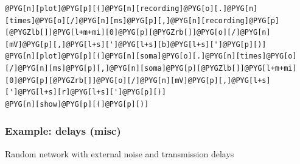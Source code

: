 \documentclass[letterpaper,10pt,english]{manual}
\begin{document}
\begin{Verbatim}[commandchars=@\[\]]
@PYG[n][plot]@PYG[p][(]@PYG[n][recording]@PYG[o][.]@PYG[n][times]@PYG[o][/]@PYG[n][ms]@PYG[p][,]@PYG[n][recording]@PYG[p][@PYGZlb[]]@PYG[l+m+mi][0]@PYG[p][@PYGZrb[]]@PYG[o][/]@PYG[n][mV]@PYG[p][,]@PYG[l+s][']@PYG[l+s][b]@PYG[l+s][']@PYG[p][)]
@PYG[n][plot]@PYG[p][(]@PYG[n][soma]@PYG[o][.]@PYG[n][times]@PYG[o][/]@PYG[n][ms]@PYG[p][,]@PYG[n][soma]@PYG[p][@PYGZlb[]]@PYG[l+m+mi][0]@PYG[p][@PYGZrb[]]@PYG[o][/]@PYG[n][mV]@PYG[p][,]@PYG[l+s][']@PYG[l+s][r]@PYG[l+s][']@PYG[p][)]
@PYG[n][show]@PYG[p][(]@PYG[p][)]
\end{Verbatim}

\resetcurrentobjects
\hypertarget{--doc-examples-misc_delays}{}

\hypertarget{index-44}{}\subsubsection{Example: delays (misc)}

Random network with external noise and transmission delays
\end{document}
